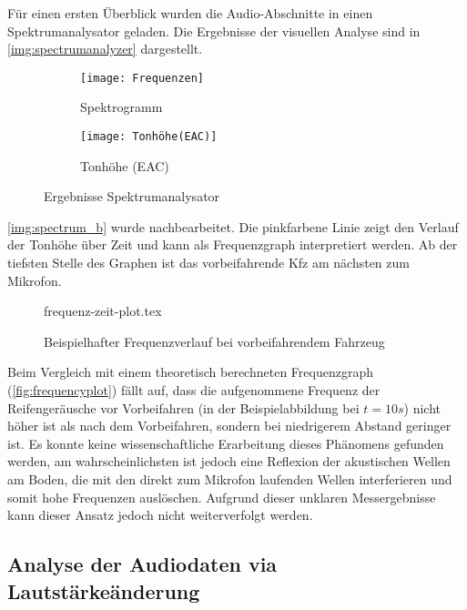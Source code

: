 Für einen ersten Überblick wurden die Audio-Abschnitte in einen Spektrumanalysator geladen. Die Ergebnisse der visuellen Analyse sind in \autoref{img:spectrumanalyzer} dargestellt.

\begin{figure}[h]
    \begin{subfigure}{.5\textwidth}
        \centering
        \texttt{[image: Frequenzen]}
        \caption{Spektrogramm}
    \end{subfigure}
    \begin{subfigure}{.5\textwidth}
        \centering
        \texttt{[image: Tonhöhe(EAC)]}
        \caption{Tonhöhe (EAC)}
        \label{img:spectrum_b}
    \end{subfigure}
    \caption{Ergebnisse Spektrumanalysator}
    \label{img:spectrumanalyzer}
\end{figure}

\autoref{img:spectrum_b} wurde nachbearbeitet. Die pinkfarbene Linie zeigt den Verlauf der Tonhöhe über Zeit und kann als Frequenzgraph interpretiert werden. Ab der tiefsten Stelle des Graphen ist das vorbeifahrende Kfz am nächsten zum Mikrofon.

\begin{figure}[h]
    \centering
    {frequenz-zeit-plot.tex}
    \caption{Beispielhafter Frequenzverlauf bei vorbeifahrendem Fahrzeug}
    \label{fig:frequencyplot}
\end{figure}

Beim Vergleich mit einem theoretisch berechneten Frequenzgraph (\autoref{fig:frequencyplot}) fällt auf, dass die aufgenommene Frequenz der Reifengeräusche vor Vorbeifahren (in der Beispielabbildung bei \(t = 10 s\)) nicht höher ist als nach dem Vorbeifahren, sondern bei niedrigerem Abstand geringer ist. Es konnte keine wissenschaftliche Erarbeitung dieses Phänomens gefunden werden, am wahrscheinlichsten ist jedoch eine Reflexion der akustischen Wellen am Boden, die mit den direkt zum Mikrofon laufenden Wellen interferieren und somit hohe Frequenzen auslöschen. Aufgrund dieser unklaren Messergebnisse kann dieser Ansatz jedoch nicht weiterverfolgt werden.

\subsection{Analyse der Audiodaten via Lautstärkeänderung}